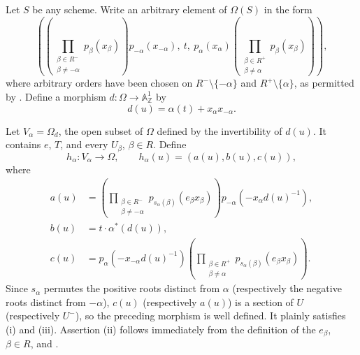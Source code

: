 Let \(S\) be any scheme. Write an arbitrary element of \(\Omega(S)\) in
the form
\[
\left(
 \left(\prod_{\substack{\beta\in R^-\\\beta\ne-\alpha}}
 p_\beta(x_\beta)\right)p_{-\alpha}(x_{-\alpha}),
 \ t,\
 p_\alpha(x_\alpha)
 \left(\prod_{\substack{\beta\in R^+\\\beta\ne\alpha}}
 p_\beta(x_\beta)\right)
\right),
\]
where arbitrary orders have been chosen on \(R^-\setminus\{-\alpha\}\)
and \(R^+\setminus\{\alpha\}\), as permitted by . Define a morphism
\(d\colon\Omega\to\mathbb A^1_{\mathbb Z}\) by
\[
 d(u)=\alpha(t)+x_\alpha x_{-\alpha}.
\]

Let \(V_\alpha=\Omega_d\), the open subset of \(\Omega\) defined by the
invertibility of \(d(u)\). It contains \(e\), \(T\), and every \(U_\beta\),
\(\beta\in R\). Define
\[
 h_\alpha\colon V_\alpha\longrightarrow\Omega,\qquad
 h_\alpha(u)=(a(u),b(u),c(u)),
\]
where
\begin{align*}
a(u)
 &=
\left(\prod_{\substack{\beta\in R^-\\\beta\ne-\alpha}}
 p_{s_\alpha(\beta)}(e_\beta x_\beta)\right)
p_{-\alpha}\!\left(-x_\alpha d(u)^{-1}\right),\\
b(u)&=t\cdot\alpha^\ast(d(u)),\\
c(u)
 &=p_\alpha\!\left(-x_{-\alpha}d(u)^{-1}\right)
\left(\prod_{\substack{\beta\in R^+\\\beta\ne\alpha}}
 p_{s_\alpha(\beta)}(e_\beta x_\beta)\right).
\end{align*}
Since \(s_\alpha\) permutes the positive roots distinct from \(\alpha\)
(respectively the negative roots distinct from \(-\alpha\)), \(c(u)\)
(respectively \(a(u)\)) is a section of \(U\) (respectively \(U^-\)),
so the preceding morphism is well defined. It plainly satisfies (i)
and (iii). Assertion (ii) follows immediately from the definition of
the \(e_\beta\), \(\beta\in R\), and .

